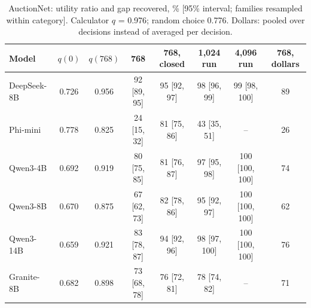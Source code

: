 \begin{table}[t]
\caption{AuctionNet: utility ratio and gap recovered, \% [95\% interval; families resampled within category]. Calculator $q$ = 0.976; random choice 0.776. Dollars: pooled over decisions instead of averaged per decision.}
\label{tab:anmain}
\footnotesize
\centering

\begin{tabular}{lccccccc}
\toprule
Model & $q(0)$ & $q(768)$ & 768 & 768, closed & 1,024 run & 4,096 run & 768, dollars \\
\midrule
DeepSeek-8B & 0.726 & 0.956 & 92 [89, 95] & 95 [92, 97] & 98 [96, 99] & 99 [98, 100] & 89 \\
Phi-mini & 0.778 & 0.825 & 24 [15, 32] & 81 [75, 86] & 43 [35, 51] & -- & 26 \\
Qwen3-4B & 0.692 & 0.919 & 80 [75, 85] & 81 [76, 87] & 97 [95, 98] & 100 [100, 100] & 74 \\
Qwen3-8B & 0.670 & 0.875 & 67 [62, 73] & 82 [78, 86] & 95 [92, 97] & 100 [100, 100] & 62 \\
Qwen3-14B & 0.659 & 0.921 & 83 [78, 87] & 94 [92, 96] & 98 [97, 100] & 100 [100, 100] & 76 \\
Granite-8B & 0.682 & 0.898 & 73 [68, 78] & 76 [72, 81] & 78 [74, 82] & -- & 71 \\
\bottomrule
\end{tabular}
\end{table}
